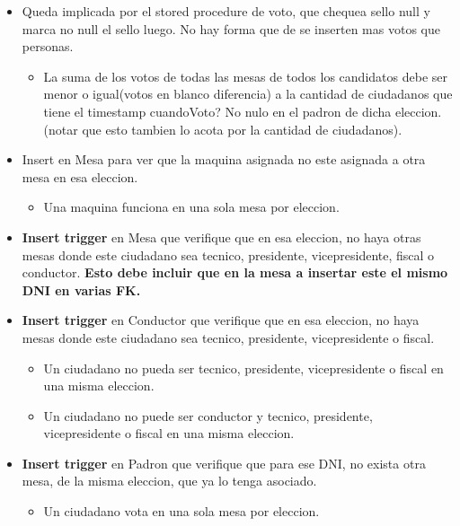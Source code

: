 \begin{itemize}
	\item{Queda implicada por el stored procedure de voto, que chequea sello null y marca no null el sello luego. No hay forma que de se inserten mas votos que personas}. 
		\begin{itemize}
			\item La suma de los votos de todas las mesas de todos los candidatos debe ser menor o igual(votos en blanco diferencia) a la cantidad de ciudadanos que tiene el timestamp cuandoVoto? No nulo en el padron de dicha eleccion. (notar que esto tambien lo acota por la cantidad de ciudadanos). 
		\end{itemize}

	\item Insert en Mesa para ver que la maquina asignada no este asignada a otra mesa en esa eleccion.
		\begin{itemize}
			\item Una maquina funciona en una sola mesa por eleccion.
		\end{itemize}
	
	\item \textbf{Insert trigger} en Mesa que verifique que en esa eleccion, no haya otras mesas donde este ciudadano sea tecnico, presidente, vicepresidente, fiscal o conductor. \textbf{Esto debe incluir que en la mesa a insertar este el mismo DNI en varias FK.}
	\item \textbf{Insert trigger} en Conductor que verifique que en esa eleccion, no haya  mesas donde este ciudadano sea tecnico, presidente, vicepresidente o fiscal.
		\begin{itemize}
			\item Un ciudadano no pueda ser tecnico, presidente, vicepresidente o fiscal en una misma eleccion.
			\item Un ciudadano no puede ser conductor y tecnico, presidente, vicepresidente o fiscal en una misma eleccion.
		\end{itemize}	

	\item \textbf{Insert trigger} en Padron que verifique que para ese DNI, no exista otra mesa, de la misma eleccion, que ya lo tenga asociado.
		\begin{itemize}
			\item Un ciudadano vota en una sola mesa por eleccion.
		\end{itemize}


\end{itemize}
